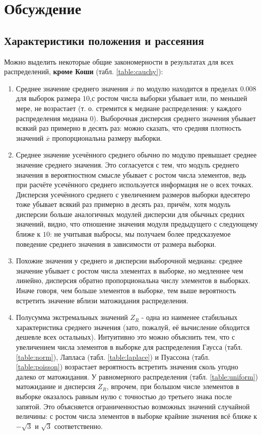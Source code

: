 \documentclass[zuev_report2.tex]{subfiles}
\begin{document}
\newpage
\section{Обсуждение}
\subsection{Характеристики положения и рассеяния}
Можно выделить некоторые общие закономерности в результатах для всех распределений, \textbf{кроме Коши} (табл. \ref{table:cauchy}):
\begin{enumerate}
	\item Среднее значение среднего значения $\overline{x}$ по модулю находится в пределах $0.008$ для выборок размера $10$,с ростом числа выборки убывает или, по меньшей мере, не возрастает (т. о. стремится к медиане распределения: у каждого распределения медиана $0$). Выборочная дисперсия среднего значения убывает всякий раз примерно в десять раз: можно сказать, что средняя плотность значений $\overline{x}$ пропорциональна размеру выборки.
	\item Среднее значение усечённого среднего обычно по модулю превышает среднее значение среднего значения. Это согласуется с тем, что модуль среднего значения в вероятностном смысле убывает с ростом числа элементов, ведь при расчёте усечённого среднего используется информация не о всех точках. Дисперсия усечённого среднего с увеличением размеров выборки вдесятеро тоже убывает всякий раз примерно в десять раз, причём, хотя модуль дисперсии больше аналогичных модулей дисперсии для обычных средних значений, видно, что отношение значения модуля предыдущего с следующему ближе к $10$: не учитывая выбросы, мы получаем более предсказуемое поведение среднего значения в зависимости от размера выборки. 
	\item Похожие значения у среднего и дисперсии выборочной медианы: среднее значение убывает с ростом числа элементах в выборке, но медленнее чем линейно, дисперсия обратно пропорциональна числу элементов в выборках. Иначе говоря, чем больше элементов в выборке, тем выше вероятность встретить значение вблизи матожидания распределения.
	\item Полусумма экстремальных значений $Z_R$ - одна из наименее стабильных характеристика среднего значения (зато, пожалуй, её вычисление обходится дешевле всех остальных). Интуитивно это можно объяснить тем, что с увеличением числа элементов в выборке для распределения Гаусса (табл. \ref{table:norm}), Лапласа (табл. \ref{table:laplace}) и Пуассона (табл. \ref{table:poisson}) возрастает вероятность встретить значения сколь угодно далеко от матожидания.  У равномерного распределения (табл. \ref{table:uniform}) матожидание и дисперсия $Z_R$, впрочем, при большом числе элементов в выборке оказалось равным нулю с точностью до третьего знака после запятой. Это объясняется ограниченностью возможных значений случайной величины: с ростом числа элементов в выборке крайние значения всё ближе к $-\sqrt{3}$ и $\sqrt{3}$ соответственно.

\end{enumerate}
\end{document}
